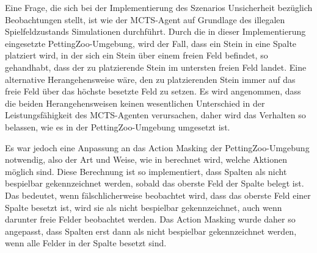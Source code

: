 Eine Frage, die sich bei der Implementierung des Szenarios Unsicherheit bezüglich Beobachtungen stellt, ist wie der MCTS-Agent auf Grundlage des illegalen Spielfeldzustands Simulationen durchführt. Durch die in dieser Implementierung eingesetzte PettingZoo-Umgebung, wird der Fall, dass ein Stein in eine Spalte platziert wird, in der sich ein Stein über einem freien Feld befindet, so gehandhabt, dass der zu platzierende Stein im untersten freien Feld landet. Eine alternative Herangehensweise wäre, den zu platzierenden Stein immer auf das freie Feld über das höchste besetzte Feld zu setzen. Es wird angenommen, dass die beiden Herangehensweisen keinen wesentlichen Unterschied in der Leistungsfähigkeit des MCTS-Agenten verursachen, daher wird das Verhalten so belassen, wie es in der PettingZoo-Umgebung umgesetzt ist.

Es war jedoch eine Anpassung an das Action Masking der PettingZoo-Umgebung notwendig, also der Art und Weise, wie in berechnet wird, welche Aktionen möglich sind. Diese Berechnung ist so implementiert, dass Spalten als nicht bespielbar gekennzeichnet werden, sobald das oberste Feld der Spalte belegt ist. Das bedeutet, wenn fälschlicherweise beobachtet wird, dass das oberste Feld einer Spalte besetzt ist, wird sie als nicht bespielbar gekennzeichnet, auch wenn darunter freie Felder beobachtet werden. Das Action Masking wurde daher so angepasst, dass Spalten erst dann als nicht bespielbar gekennzeichnet werden, wenn alle Felder in der Spalte besetzt sind.
